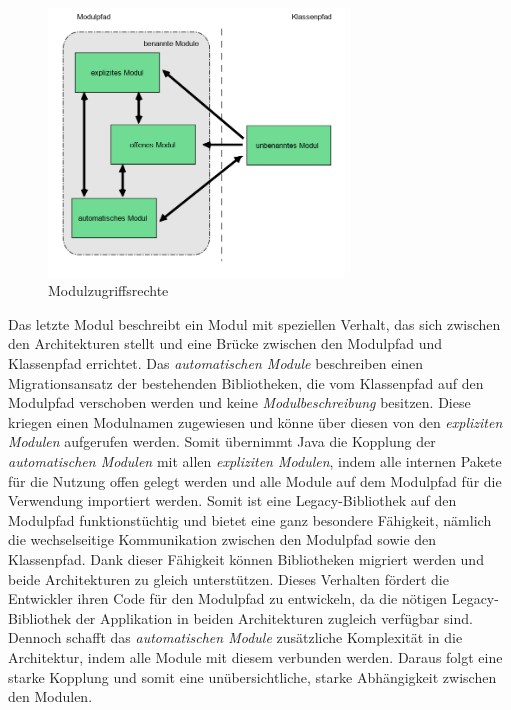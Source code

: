     \begin{figure}[h]
      \centering
      \includegraphics[width=0.7\textwidth]{material/images/module-access.png}
      \caption{Modulzugriffsrechte}
      \label{fig:kopplung}
    \end{figure}

    Das letzte Modul beschreibt ein Modul mit speziellen Verhalt, das sich zwischen den Architekturen stellt und eine Brücke zwischen den Modulpfad und Klassenpfad errichtet. Das \textit{automatischen Module} beschreiben einen Migrationsansatz der bestehenden Bibliotheken, die vom Klassenpfad auf den Modulpfad verschoben werden und keine \textit{Modulbeschreibung} besitzen. Diese kriegen einen Modulnamen zugewiesen und könne über diesen von den \textit{expliziten Modulen} aufgerufen werden. Somit übernimmt Java die Kopplung der \textit{automatischen Modulen} mit allen \textit{expliziten Modulen}, indem alle internen Pakete für die Nutzung offen gelegt werden und alle Module auf dem Modulpfad für die Verwendung importiert werden. Somit ist eine Legacy-Bibliothek auf den Modulpfad funktionstüchtig und bietet eine ganz besondere Fähigkeit, nämlich die wechselseitige Kommunikation zwischen den Modulpfad sowie den Klassenpfad. Dank dieser Fähigkeit können Bibliotheken migriert werden und beide Architekturen zu gleich unterstützen. Dieses Verhalten fördert die Entwickler ihren Code für den Modulpfad zu entwickeln, da die nötigen Legacy-Bibliothek der Applikation in beiden Architekturen zugleich verfügbar sind. Dennoch schafft das \textit{automatischen Module} zusätzliche Komplexität in die Architektur, indem alle Module mit diesem verbunden werden. Daraus folgt eine starke Kopplung und somit eine unübersichtliche, starke Abhängigkeit zwischen den Modulen.\bigbreak

